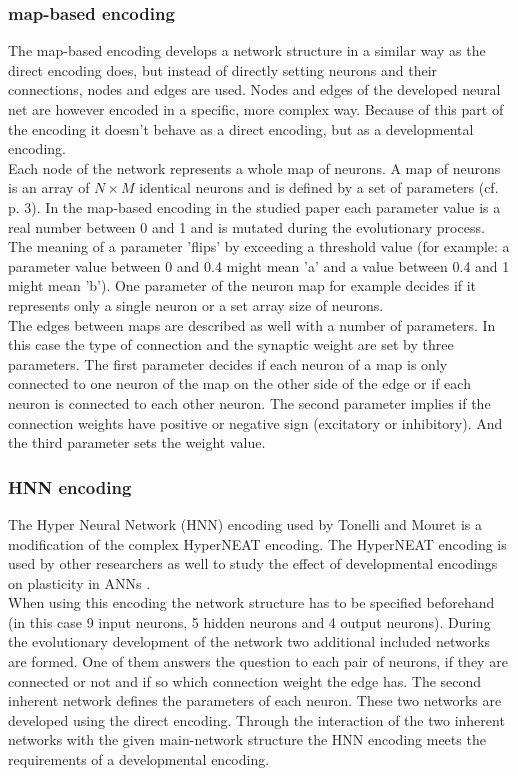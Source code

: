 \documentclass[12pt,twoside]{article}
\theoremstyle{plain}
\theoremstyle{definition}
\theoremstyle{remark}
\begin{document}
\subsubsection{map-based encoding}
The map-based encoding develops a network structure in a similar way as the direct encoding does, but instead of directly setting neurons and their connections, nodes and edges are used.
Nodes and edges of the developed neural net are however encoded in a specific, more complex way. Because of this part of the encoding it doesn't behave as a direct encoding, but as a developmental encoding.\\
Each node of the network represents a whole map of neurons. A map of neurons is an array of $N \times M$ identical neurons and is defined by a set of parameters (cf. \cite{tonelli2011using} p. 3). 
In the map-based encoding in the studied paper each parameter value is a real number between 0 and 1 and is mutated during the evolutionary process.
The meaning of a parameter 'flips' by exceeding a threshold value (for example: a parameter value between 0 and 0.4 might mean 'a' and a value between 0.4 and 1 might mean 'b').
One parameter of the neuron map for example decides if it represents only a single neuron or a set array size of neurons.\\
The edges between maps are described as well with a number of parameters.
In this case the type of connection and the synaptic weight are set by three parameters.
The first parameter decides if each neuron of a map is only connected to one neuron of the map on the other side of the edge or if each neuron is connected to each other neuron.
The second parameter implies if the connection weights have positive or negative sign (excitatory or inhibitory). And the third parameter sets the weight value.

\subsubsection{HNN encoding}
The Hyper Neural Network (HNN) encoding used by Tonelli and Mouret is a modification of the complex HyperNEAT encoding. The HyperNEAT encoding is used by other researchers as well to study the effect of developmental encodings on plasticity in ANNs \cite{clune2010investigating} \cite{verbancsics2011constraining}.\\
When using this encoding the network structure has to be specified beforehand (in this case 9 input neurons, 5 hidden neurons and 4 output neurons).
During the evolutionary development of the network two additional included networks are formed. One of them answers the question to each pair of neurons, if they are connected or not and if so which connection weight the edge has.
The second inherent network defines the parameters of each neuron. These two networks are developed using the direct encoding.
Through the interaction of the two inherent networks with the given main-network structure the HNN encoding meets the requirements of a developmental encoding.
\end{document}
